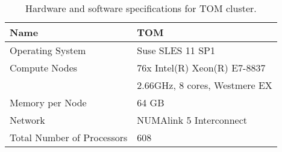 \documentclass[3p]{elsarticle}
\begin{document}
\begin{table}[ht!]
    \centering
    \begin{tabular}{ l | l }
        Name                        & TOM \\
        \hline\hline
        Operating System            & Suse SLES 11 SP1 \\
        Compute Nodes               & 76x Intel(R) Xeon(R) E7-8837 \\
                                    & \qquad 2.66GHz, 8 cores, Westmere EX \\
        Memory per Node             & 64 GB \\
        Network                     & NUMAlink 5 Interconnect \\
                Total Number of Processors  & 608 \\
    \end{tabular}
    \caption{Hardware and software specifications for TOM cluster.}
\end{table}

\FloatBarrier
\end{document}
